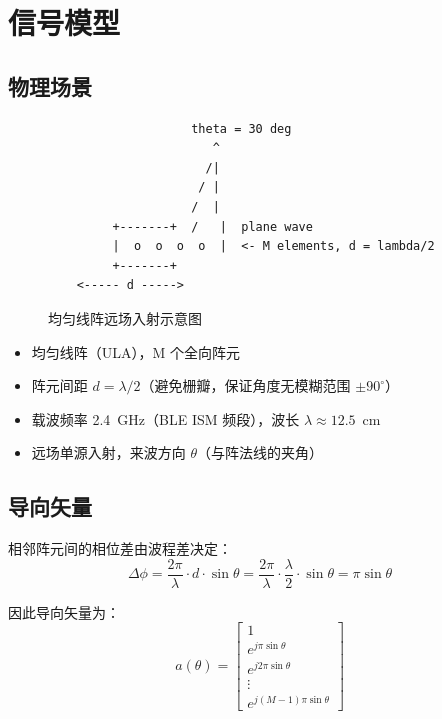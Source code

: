 \documentclass[11pt,a4paper]{article}
\begin{document}
\section{信号模型}

\subsection{物理场景}

\begin{figure}[H]
\centering
\begin{verbatim}
                    theta = 30 deg
                       ^
                      /|
                     / |
                    /  |
         +-------+  /   |  plane wave
         |  o  o  o  o  |  <- M elements, d = lambda/2
         +-------+
    <----- d ----->
\end{verbatim}
\caption{均匀线阵远场入射示意图}
\label{fig:ula}
\end{figure}

\begin{itemize}
    \item 均匀线阵（ULA），M 个全向阵元
    \item 阵元间距 $d = \lambda/2$（避免栅瓣，保证角度无模糊范围 $\pm 90^\circ$）
    \item 载波频率 2.4~GHz（BLE ISM 频段），波长 $\lambda \approx 12.5$~cm
    \item 远场单源入射，来波方向 $\theta$（与阵法线的夹角）
\end{itemize}

\subsection{导向矢量}

相邻阵元间的相位差由波程差决定：
\begin{equation}
\Delta\phi = \frac{2\pi}{\lambda} \cdot d \cdot \sin\theta
           = \frac{2\pi}{\lambda} \cdot \frac{\lambda}{2} \cdot \sin\theta
           = \pi \sin\theta
\end{equation}

因此导向矢量为：
\begin{equation}
a(\theta) = \begin{bmatrix}
1 \\
e^{j\pi\sin\theta} \\
e^{j2\pi\sin\theta} \\
\vdots \\
e^{j(M-1)\pi\sin\theta}
\end{bmatrix}
\end{equation}
\end{document}
